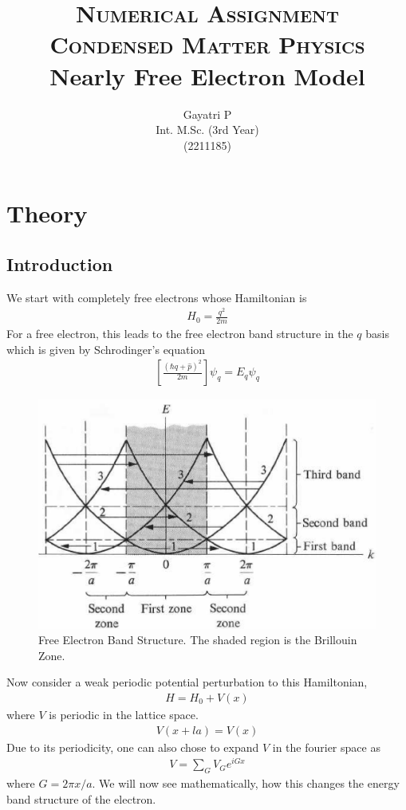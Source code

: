 \documentclass[12pt,a4paper]{article}
\title{\textsc{\large Numerical Assignment\\Condensed Matter Physics} \\ {\bf Nearly Free Electron Model}}
\author{Gayatri P\\Int. M.Sc. (3rd Year)\\ (2211185)}
\begin{document}
\maketitle
\newcommand{\cfunc}[1]{\textnormal{\texttt{\detokenize{#1}}}}
\tableofcontents
\section{Theory}
\subsection{Introduction}
We start with completely free electrons whose Hamiltonian is
\begin{align*}
    H_0 = \frac{q^2}{2m}
\end{align*}
For a free electron, this leads to the free electron band structure in the $q$ basis which is given by Schrodinger's equation
\begin{align*}
    \left[\frac{(\hbar q + \hat{p})^2}{2m}\right]\psi_q = E_q\psi_q
\end{align*} 

\begin{figure}[H]
    \centering
    \includegraphics[width=0.7\linewidth]{images/th1.png}
    \caption{Free Electron Band Structure. The shaded region is the Brillouin Zone.}
\end{figure}

Now consider a weak periodic potential perturbation to this Hamiltonian,
\begin{align*}
    H = H_0 + V(x)
\end{align*}
where $V$ is periodic in the lattice space.
\begin{align*}
    V(x+la) = V(x)
\end{align*}
Due to its periodicity, one can also chose to expand $V$ in the fourier space as
\begin{align*}
    V= \sum_{G} V_G e^{iGx}
\end{align*}
where $G=2\pi x/a$. We will now see mathematically, how this changes the energy band structure of the electron.
\end{document}
